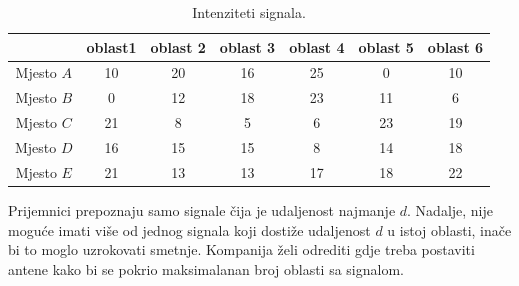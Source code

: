 \documentclass[a4paper, utf8, 11pt, colorlinks]{article}
\begin{document}
\begin{table}[!ht]
    \centering
    \begin{tabular}{c|cccccc} \hline
     \              & oblast1 & oblast 2 & oblast 3 & oblast 4 & oblast 5 & oblast 6 \\ \hline
     Mjesto $A$     & 10  & 20 & 16 & 25 & 0   & 10   \\
     Mjesto $B$     & 0   & 12 & 18 &  23 & 11 & 6   \\
     Mjesto $C$     & 21  &  8 & 5  &  6 & 23  &  19 \\
     Mjesto $D$    &  16 &  15 & 15 &  8 & 14 & 18   \\
     Mjesto $E $    &  21 & 13 & 13 & 17 & 18  & 22    \\ \hline
    \end{tabular}
    \caption{Intenziteti signala.}
    \label{tab:tb-3}
\end{table}

Prijemnici prepoznaju samo signale čija je udaljenost najmanje   $d$. Nadalje, nije moguće imati više od jednog signala koji dostiže udaljenost $d$ u istoj oblasti, inače bi to moglo uzrokovati smetnje. %
Kompanija želi odrediti gdje treba postaviti antene kako bi se pokrio maksimalanan broj oblasti sa signalom. 
\end{document}
